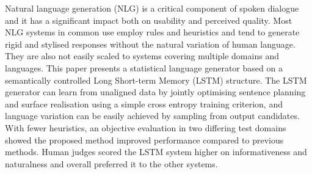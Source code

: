 Natural language generation (NLG) is a critical component of spoken dialogue and it has a significant impact both on usability and perceived quality.  Most NLG systems in common use employ rules and heuristics and tend to generate rigid and stylised responses without the natural variation of human language. They are also not easily scaled to systems covering multiple domains and languages. This paper presents a statistical language generator based on a semantically controlled Long Short-term Memory (LSTM) structure. The LSTM generator can learn from unaligned data by jointly optimising sentence planning and surface realisation  using a simple cross entropy training criterion, and language variation can be easily achieved by sampling from output candidates. With fewer heuristics, an objective evaluation in two differing test domains showed the proposed method improved performance compared to previous methods. Human judges scored the LSTM system higher on informativeness and naturalness and overall preferred it to the other systems.
